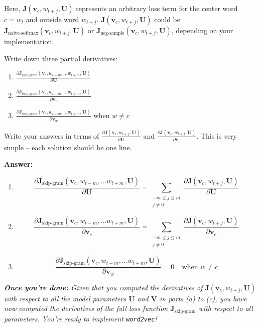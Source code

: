 \documentclass{article}
\newenvironment{answer}{
    {\bf Answer:} \sf \begingroup\color{red}
}{\endgroup}%
\begin{document}
\begin{enumerate}[label=(\alph*)]
Here, $\bm J(\bm v_c, w_{t+j}, \bm U)$ represents an arbitrary loss term for the center word $c=w_t$ and outside word $w_{t+j}$. $\bm J(\bm v_c, w_{t+j}, \bm U)$ could be $\bm J_{\text{naive-softmax}}(\bm v_c, w_{t+j}, \bm U)$ or $\bm J_{\text{neg-sample}}(\bm v_c, w_{t+j}, \bm U)$, depending on your implementation.

Write down three partial derivatives: 
\begin{enumerate}[label=(\roman*)]
    \item ${\frac{\partial \bm J_{\textrm{skip-gram}}(\bm v_c, w_{t-m},\ldots w_{t+m}, \bm U)} {\partial \bm U}}$
    \item ${\frac{\partial \bm J_{\textrm{skip-gram}}(\bm v_c, w_{t-m},\ldots w_{t+m}, \bm U)} {\partial \bm v_c}}$
    \item ${\frac{\partial \bm J_{\textrm{skip-gram}}(\bm v_c, w_{t-m},\ldots w_{t+m}, \bm U)} {\partial \bm v_w}}$ when $w \ne c$
\end{enumerate}
Write your answers in terms of ${\frac{\partial \bm J(\bm v_c, w_{t+j}, \bm U)}{\partial \bm U}}$ and ${\frac{\partial \bm J(\bm v_c, w_{t+j}, \bm U)}{\partial \bm v_c}}$. This is very simple -- each solution should be one line.

\begin{shaded}
\begin{answer}
\begin{enumerate}[label=(\roman*)]
    \item $${\frac{\partial \bm J_{\textrm{skip-gram}}(\bm v_c, w_{t-m},\ldots w_{t+m}, \bm U)} {\partial \bm U}} = \sum_{\substack{-m \leq j \leq m \\ j \neq 0}} \frac{\partial \bm J(\bm v_c, w_{t+j}, \bm U)}{\partial \bm U}$$
    \item $${\frac{\partial \bm J_{\textrm{skip-gram}}(\bm v_c, w_{t-m},\ldots w_{t+m}, \bm U)} {\partial \bm v_c}} = \sum_{\substack{-m \leq j \leq m \\ j \neq 0}} \frac{\partial \bm J(\bm v_c, w_{t+j}, \bm U)}{\partial \bm v_c}$$
    \item $${\frac{\partial \bm J_{\textrm{skip-gram}}(\bm v_c, w_{t-m},\ldots w_{t+m}, \bm U)} {\partial \bm v_w}} = 0 \; \; \; \; \text{when } w \neq c$$
\end{enumerate}
\end{answer}
\end{shaded}

\textit{\textbf{Once you're done:} Given that you computed the derivatives of $\bm J(\bm v_c, w_{t+j}, \bm U)$ with respect to all the model parameters $\bm U$ and $\bm V$ in parts (a) to (c), you have now computed the derivatives of the full loss function $\bm J_{\text{skip-gram}}$ with respect to all parameters. You're ready to implement \texttt{word2vec}!} %

\end{enumerate}
\end{document}
